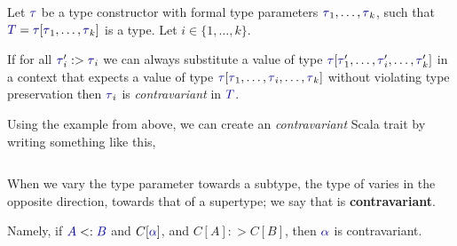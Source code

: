 \begin{definition}[Contravariance]\label{def:Type_Contravariance}
  Let $\DataType$ be a type constructor with formal type parameters $\DataType_{1}, \ldots , \DataType_{k}$, such that $\SemanticType{T} = \DataType [\DataType_{1}, \ldots, \DataType_{k}]$ is a type.
  Let $i \in \lbrace 1,\ldots, k \rbrace$.

  If for all $\DataType_{i}' :> \DataType_{i}$ we can always substitute a value of type $\DataType [\DataType_{1}',\ldots, \DataType_{i}', \ldots, \DataType_{k}']$ in a context that expects a value of type $\DataType [\DataType_{1}, \ldots, \DataType_{i}, \ldots, \DataType_{k}]$ without violating type preservation then $\DataType_{i}$ is \emph{contravariant} in $\SemanticType{T}$.

  Using the  example from above, we can create an \emph{contravariant} Scala trait by writing something like this,
  \inputminted[frame=lines,linenos]{scala}{./EDAP05-Concepts_Programming_Languages-Sections/Advanced_Data_Types/Code/ContravariantBox.scala}
  When we vary the type parameter  towards a subtype, the type of  varies in the opposite direction, towards that of a supertype; we say that  is \textbf{contravariant}.

  Namely, if $\SemanticType{A} <: \SemanticType{B}$ and $C[\SemanticType{\alpha}]$, and $C[A] :> C[B]$, then $\SemanticType{\alpha}$ is contravariant.
\end{definition}

